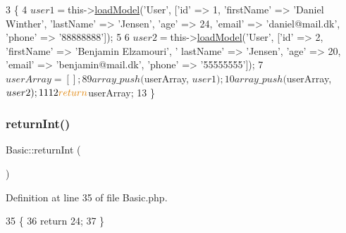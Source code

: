 \begin{DoxyCode}
3                                      \{
4         $user1 = $this->\hyperlink{class_base_controller_a710080f75b12adc69eb506ee63cffe6b}{loadModel}(\textcolor{stringliteral}{'User'}, [\textcolor{stringliteral}{'id'} => 1, \textcolor{stringliteral}{'firstName'} => \textcolor{stringliteral}{'Daniel Winther'}, \textcolor{stringliteral}{'lastName'} 
      => \textcolor{stringliteral}{'Jensen'}, \textcolor{stringliteral}{'age'} => 24, \textcolor{stringliteral}{'email'} => \textcolor{stringliteral}{'daniel@mail.dk'}, \textcolor{stringliteral}{'phone'} => \textcolor{stringliteral}{'88888888'}]);
5 
6         $user2 = $this->\hyperlink{class_base_controller_a710080f75b12adc69eb506ee63cffe6b}{loadModel}(\textcolor{stringliteral}{'User'}, [\textcolor{stringliteral}{'id'} => 2, \textcolor{stringliteral}{'firstName'} => \textcolor{stringliteral}{'Benjamin Elzamouri'}, \textcolor{stringliteral}{'
      lastName'} => \textcolor{stringliteral}{'Jensen'}, \textcolor{stringliteral}{'age'} => 20, \textcolor{stringliteral}{'email'} => \textcolor{stringliteral}{'benjamin@mail.dk'}, \textcolor{stringliteral}{'phone'} => \textcolor{stringliteral}{'55555555'}]);
7         $userArray = [];
8 
9         array\_push($userArray, $user1);
10         array\_push($userArray, $user2);
11 
12         \textcolor{keywordflow}{return} $userArray;
13     \}
\end{DoxyCode}
\hypertarget{class_basic_ade94a138ee91270bc419445603df2ec7}{}\label{class_basic_ade94a138ee91270bc419445603df2ec7} 
\subsubsection{\texorpdfstring{return\+Int()}{returnInt()}}
{\footnotesize\ttfamily Basic\+::return\+Int (\begin{DoxyParamCaption}{ }\end{DoxyParamCaption})}



Definition at line 35 of file Basic.\+php.


\begin{DoxyCode}
35                                 \{
36         \textcolor{keywordflow}{return} 24;
37     \}
\end{DoxyCode}
\hypertarget{class_basic_a68b47cdce3c867df841f6a29b8de624b}{}\label{class_basic_a68b47cdce3c867df841f6a29b8de624b} 
